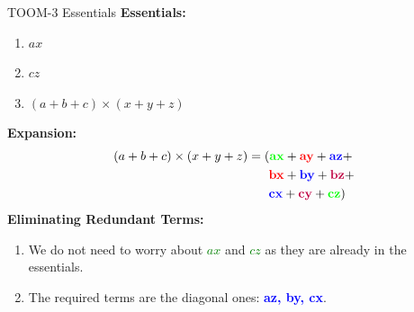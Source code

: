 \documentclass{beamer}
\begin{document}
\begin{frame}{TOOM-3 Essentials}
    \textbf{Essentials:}
    \begin{enumerate}
        \item $ax$
        \item $cz$
        \item $(a + b + c) \times (x + y + z)$
    \end{enumerate}
    \textbf{Expansion:}
    \begin{align*}
        (a + b + c) \times (x + y + z) &= (\textcolor{green}{\mathbf{ax}} + \textcolor{red}{\mathbf{ay}} + \textcolor{blue}{\mathbf{az}} + \\
                                      \ & \ \ \ \ \ \textcolor{red}{\mathbf{bx}} + \textcolor{blue}{\mathbf{by}} +\textcolor{purple}{\mathbf{bz}} + \\
                                      \ & \ \ \ \ \ \textcolor{blue}{\mathbf{cx}}+  \textcolor{purple}{\mathbf{cy}} + \textcolor{green}{\mathbf{cz}} )
    \end{align*}
    \textbf{Eliminating Redundant Terms:}
    \begin{enumerate}
        \item We do not need to worry about \textcolor{green}{$ax$} and \textcolor{green}{$cz$} as they are already in the essentials.
        \item The required terms are the diagonal ones: \textcolor{blue}{\textbf{az, by, cx}}.
    \end{enumerate}
\end{frame}
\end{document}
